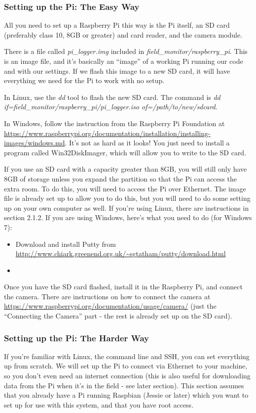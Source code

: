 \documentclass[10pt]{article}
\begin{document}
\subsubsection{Setting up the Pi: The Easy Way}
All you need to set up a Raspberry Pi this way is the Pi itself, an SD card (preferably class 10, 8GB or greater) and card reader, and the camera module.

There is a file called \textit{pi\_logger.img} included in \textit{field\_monitor/raspberry\_pi}. This is an image file, and it's basically an ``image'' of a working Pi
running our code and with our settings. If we flash this image to a new SD card, it will have everything we need for the Pi to work with no setup. 

In Linux, use the \textit{dd} tool to flash the new SD card. The command is \textit{dd if=field\_monitor/raspberry\_pi/pi\_logger.iso of=/path/to/new/sdcard}. 

In Windows, follow the instruction from the Raspberry Pi Foundation at \url{https://www.raspberrypi.org/documentation/installation/installing-images/windows.md}. It's
not as hard as it looks! You just need to install a program called Win32DiskImager, which will allow you to write to the SD card.

If you use an SD card with a capacity greater than 8GB, you will still only have 8GB of storage unless you expand the partition so that the Pi can
access the extra room. To do this, you will need to access the Pi over Ethernet. The image file is already set up to allow you to do this, but you will need to
do some setting up on your own computer as well. If you're using Linux, there are instructions in section 2.1.2. If you are using Windows, here's what you need
to do (for Windows 7):

\begin{itemize}
 \item Download and install Putty from \url{http://www.chiark.greenend.org.uk/~sgtatham/putty/download.html}
 \item 
\end{itemize}


Once you have the SD card flashed, install it in the Raspberry Pi, and connect the camera. There are instructions on how to connect the camera at
\url{https://www.raspberrypi.org/documentation/usage/camera/} (just the ``Connecting the Camera'' part - the rest is already set up on the SD card).

\subsubsection{Setting up the Pi: The Harder Way}
If you're familiar with Linux, the command line and SSH, you can set everything up from scratch. We will set up the Pi to connect via Ethernet to your machine, so you don't
even need an internet connection (this is also useful for downloading data from the Pi when it's in the field - see later section). This section assumes that you already
have a Pi running Raspbian (Jessie or later) which you want to set up for use with this system, and that you have root access. 
\end{document}
